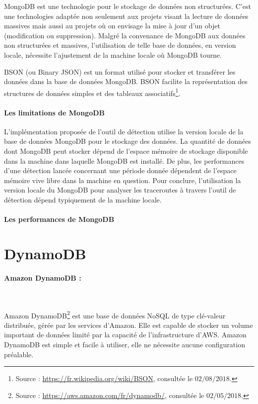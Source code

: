  
 MongoDB est une technologie pour le stockage de données non structurées. C'est une technologies adaptée non seulement aux projets visant la lecture de données massives mais aussi au projets où on envisage la mise à jour d'un objet (modification ou suppression). Malgré la convenance de MongoDB aux données non structurées et massives, l'utilisation de telle base de données, en version locale, nécessite l'ajustement de la machine locale où MongoDB tourne. 

\begin{tcolorbox}
BSON (ou Binary JSON) est un format utilisé pour stocker et transférer les données dans la base de données MongoDB. BSON facilite la représentation des structures de données simples et des tableaux associatifs\footnote{Source : \url{https://fr.wikipedia.org/wiki/BSON}, consultée le $ 02/08/2018 $.}.
\end{tcolorbox}
\paragraph{Les limitations de MongoDB}

L'implémentation proposée de l'outil de détection utilise la version locale de la base de données MongoDB pour le stockage des données.  La quantité de données dont MongoDB peut stocker dépend de l'espace mémoire de stockage disponible dans la machine dans laquelle MongoDB est installé. De plus, les performances d'une détection lancée concernant une période donnée dépendent de l'espace mémoire vive libre dans la machine en question. Pour conclure, l'utilisation la version locale du MongoDB pour analyser les traceroutes à travers l'outil de détection dépend typiquement de la machine locale.

\paragraph{Les performances de MongoDB}

\section{DynamoDB}

 \paragraph{Amazon DynamoDB :}\label{aws:dynmo}~

Amazon DynamoDB\footnote{Source : \url{https://aws.amazon.com/fr/dynamodb/}, consultée le $02/05/2018$.} est une base de données NoSQL de type clé-valeur distribuée, gérée par les services d'Amazon. Elle est capable de stocker un volume important de données limité par la capacité de l'infrastructure d'AWS. Amazon DynamoDB   est simple et facile à utiliser,  elle ne nécessite aucune configuration préalable. 

